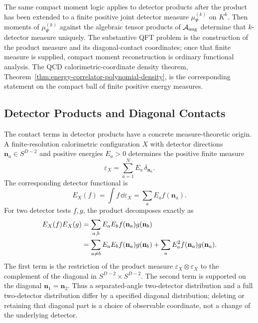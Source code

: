 The same compact moment logic applies to detector products after the product
has been extended to a finite positive joint detector measure
\(\mu_\Psi^{(k)}\) on \(K^k\).  Then moments of
\(\mu_\Psi^{(k)}\) against the algebraic tensor products of
\(\mathcal A_{\rm ang}\) determine that \(k\)-detector measure uniquely.  The
substantive QFT problem is the construction of the product measure and its
diagonal-contact coordinates; once that finite measure is supplied, compact
moment reconstruction is ordinary functional analysis.  The QCD
calorimetric-coordinate density theorem,
Theorem~\ref{thm:energy-correlator-polynomial-density}, is the corresponding
statement on the compact ball of finite positive energy measures.

\subsection{Detector Products and Diagonal Contacts}
\label{subsec:cft-detector-products-contacts}

The contact terms in detector products have a concrete measure-theoretic
origin.  A finite-resolution calorimetric configuration \(X\) with detector
directions \(\mathbf n_a\in S^{D-2}\) and positive energies \(E_a>0\)
determines the positive finite measure
\begin{equation}
  \varepsilon_X
  =
  \sum_{a=1}^N E_a\,\delta_{\mathbf n_a}.
  \label{eq:finite-detector-energy-measure}
\end{equation}
The corresponding detector functional is
\[
  E_X(f)=\int f\,\dd\varepsilon_X
  =
  \sum_a E_a f(\mathbf n_a).
\]
For two detector tests \(f,g\), the product decomposes exactly as
\begin{align}
  E_X(f)E_X(g)
  &=
  \sum_{a,b}E_aE_b f(\mathbf n_a)g(\mathbf n_b)
  \notag\\
  &=
  \sum_{a\neq b}E_aE_b f(\mathbf n_a)g(\mathbf n_b)
  +
  \sum_a E_a^2 f(\mathbf n_a)g(\mathbf n_a).
  \label{eq:finite-detector-diagonal-decomposition}
\end{align}
The first term is the restriction of the product measure
\(\varepsilon_X\otimes\varepsilon_X\) to the complement of the diagonal in
\(S^{D-2}\times S^{D-2}\).  The second term is supported on the diagonal
\(\mathbf n_1=\mathbf n_2\).  Thus a separated-angle two-detector
distribution and a full two-detector distribution differ by a specified
diagonal distribution; deleting or retaining that diagonal part is a choice of
observable coordinate, not a change of the underlying detector.

